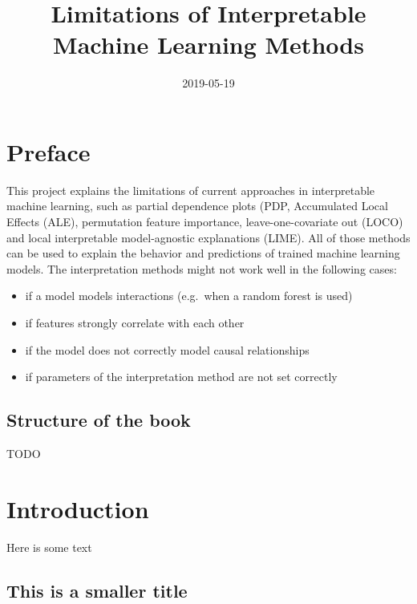 \documentclass[]{krantz}
\title{Limitations of Interpretable Machine Learning Methods}
\author{}
\date{2019-05-19}
\providecommand{\tightlist}{%
  \setlength{\itemsep}{0pt}\setlength{\parskip}{0pt}}
\begin{document}
\maketitle

{
\hypersetup{linkcolor=black}
\setcounter{tocdepth}{2}
\tableofcontents
}
\listoftables
\listoffigures
\section*{Preface}\label{preface}

This project explains the limitations of current approaches in
interpretable machine learning, such as partial dependence plots (PDP,
Accumulated Local Effects (ALE), permutation feature importance,
leave-one-covariate out (LOCO) and local interpretable model-agnostic
explanations (LIME). All of those methods can be used to explain the
behavior and predictions of trained machine learning models. The
interpretation methods might not work well in the following cases:

\begin{itemize}
\tightlist
\item
  if a model models interactions (e.g.~when a random forest is used)
\item
  if features strongly correlate with each other
\item
  if the model does not correctly model causal relationships
\item
  if parameters of the interpretation method are not set correctly
\end{itemize}

\subsection*{Structure of the book}\label{structure-of-the-book}

TODO

\mainmatter

\section{Introduction}\label{introduction}

Here is some text

\subsection{This is a smaller title}\label{this-is-a-smaller-title}
\end{document}
